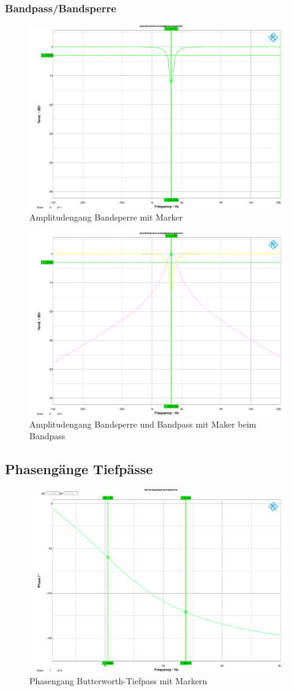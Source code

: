 \newpage

\subsubsection{Bandpass/Bandsperre}
\begin{figure}[h]
\centering
\includegraphics[width=0.60\linewidth]{Bilder/ImLabor/Amplitudengang_3_2_BS}
\caption{Amplitudengang Bandsperre mit Marker}
\label{fig:Amplitudengang_3_2_BS}
\end{figure}

\begin{figure}[h]
\centering
\includegraphics[width=0.60\linewidth]{Bilder/ImLabor/Amplitudengang_3_3_BP_BS}
\caption{Amplitudengang Bandsperre und Bandpass mit Maker beim Bandpass}
\label{fig:Amplitudengang_3_3_BP_BS}
\end{figure}

\newpage

\subsection{Phasengänge Tiefpässe}

\begin{figure}[h]
\centering
\includegraphics[width=0.60\linewidth]{Bilder/ImLabor/Phasengang_4_1_Butter_TP}
\caption{Phasengang Butterworth-Tiefpass mit Markern}
\label{fig:Phasengang_4_1_Butter_TP}
\end{figure}


